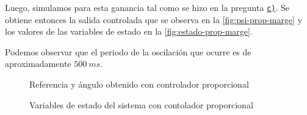 Luego, simulamos para esta ganancia tal como se hizo en la pregunta \hyperref[pregunta-c]{\texttt{c)}}.
Se obtiene entonces la salida controlada que se observa en la \autoref{fig:psi-prop-marge}
y los valores de las variables de estado en la \autoref{fig:estado-prop-marge}.

Podemos observar que el periodo de la oscilación que ocurre es de aproximadamente
$500\ \unit{ms}$.

\begin{figure}[h]
  \centering
  
  \caption{Referencia y ángulo obtenido con controlador proporcional}\label{fig:psi-prop-marge}
\end{figure}

\begin{figure}[h]
  \centering
  
  \caption{Variables de estado del sistema con contolador proporcional}\label{fig:estado-prop-marge}

\end{figure}
